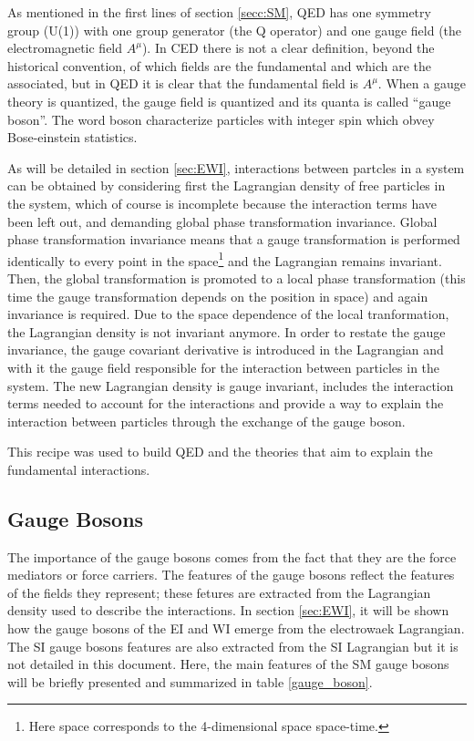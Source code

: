 \noindent As mentioned in the first lines of section \ref{secc:SM}, QED has one symmetry group (U(1)) with one group generator (the Q operator) and one gauge field (the electromagnetic field $A^\mu$). In CED there is not a clear definition, beyond the historical convention, of which fields are the fundamental and which are the associated, but in QED it is clear that the fundamental field is $A^\mu$. When a gauge theory is quantized, the gauge field is quantized and its quanta is called ``gauge boson''. The word boson characterize particles with integer spin which obvey Bose-einstein statistics.      

\noindent As will be detailed in section \ref{sec:EWI}, interactions between partcles in a system can be obtained by considering first the Lagrangian density of free particles in the system, which of course is incomplete because the interaction terms have been left out, and demanding global phase transformation invariance. Global phase transformation invariance means that a gauge transformation is performed identically to every point in the space\footnote{Here space corresponds to the 4-dimensional space \ie space-time.} and the Lagrangian remains invariant. Then, the global transformation is promoted to a local phase transformation (this time the gauge transformation depends on the position in space) and again invariance is required. Due to the space dependence of the local tranformation, the Lagrangian density is not invariant anymore. In order to restate the gauge invariance, the gauge covariant derivative is introduced in the Lagrangian and with it the gauge field responsible for the interaction between particles in the system. The new Lagrangian density is gauge invariant, includes the interaction terms needed to account for the interactions and provide a way to explain the interaction between particles through the exchange of the gauge boson.

\noindent This recipe was used to build QED and the theories that aim to explain the fundamental interactions.   


\subsection{Gauge Bosons}\label{sec:gb}

The importance of the gauge bosons comes from the fact that they are the force mediators or force carriers. The features of the gauge bosons reflect the features of the fields they represent; these fetures are extracted from the Lagrangian density used to describe the interactions. In section \ref{sec:EWI}, it will be shown how the gauge bosons of the EI and WI emerge from the electrowaek Lagrangian. The SI gauge bosons features are also extracted from the SI Lagrangian but it is not detailed in this document. Here, the main features of the SM gauge bosons will be briefly presented and summarized in table \ref{gauge_boson}.

